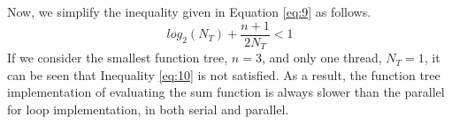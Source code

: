\documentclass[11pt]{article}
\begin{document}
\begin{enumerate}[leftmargin=0.9in]
\begin{enumerate}[leftmargin=0.3in]
\begin{equation}
           \end{equation}
           Now, we simplify the inequality given in Equation \ref{eq:9} as follows.
           \begin{equation} \label{eq:10}
               log_2(N_T) + \frac{n+1}{2N_T} < 1
           \end{equation}
           If we consider the smallest function tree, $n=3$, and only one thread, $N_T = 1$, it can be seen that Inequality \ref{eq:10} is not satisfied. As a result, the function tree implementation of evaluating the sum function is always slower than the parallel for loop implementation, in both serial and parallel.  

   \end{enumerate} %

\end{enumerate} %
\end{document}

